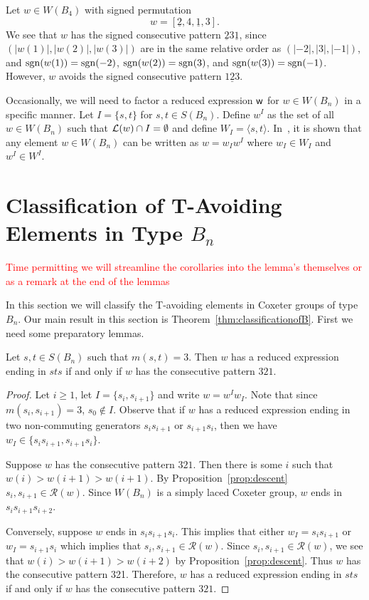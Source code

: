 \begin{example}
Let $w \in W(B_4)$ with signed permutation \[w=[\underline{2},4, \underline{1}, 3].\] We see that $w$ has the signed consecutive pattern $\underline{2} 3 \underline{1}$, since $(|w(1)|, |w(2)|, |w(3)|)$ are in the same relative order as $(|-2|, |3|, |-1|)$, and $\mathrm{sgn}(w(1))=\mathrm{sgn}(-2)$, $\mathrm{sgn}(w(2))=\mathrm{sgn}(3)$, and $\mathrm{sgn}(w(3))=\mathrm{sgn}(-1)$. However, $w$ avoids the signed consecutive pattern $1\underline{2}3$.
\end{example}

Occasionally, we will need to factor a reduced expression $\mathsf{w}$ for $w \in W(B_n)$ in a specific manner. Let $I=\{s,t\}$ for $s, t \in S(B_n)$. Define $w^I$ as the set of all $w \in W(B_n)$ such that $\mathcal{L}(w) \cap I= \emptyset$ and define $W_I=\langle s,t \rangle$. In~\cite{Humphreys1990}, it is shown that any element $w \in W(B_n)$ can be written as $w=w_Iw^I$ where $w_I \in W_I$ and $w^I \in W^I$.

\section{Classification of T-Avoiding Elements in Type $B_n$}\label{sec:TAB}

\textcolor{red}{Time permitting we will streamline the corollaries into the lemma's themselves or as a remark at the end of the lemmas}

In this section we will classify the T-avoiding elements in Coxeter groups of type $B_n$. Our main result in this section is Theorem~\ref{thm:classificationofB}. First we need some preparatory lemmas. 

\begin{lemma}\label{lem:sts}
Let $s,t \in S(B_n)$ such that $m(s,t)=3$. Then $w$ has a reduced expression ending in $sts$ if and only if $w$ has the consecutive pattern $321$.
\begin{proof}
	Let $i \geq 1$, let $I=\{s_i,s_{i+1}\}$ and write $w=w^Iw_I$. Note that since $m(s_i,s_{i+1})=3$, $s_0 \notin I$. Observe that if $w$ has a reduced expression ending in two non-commuting generators $s_is_{i+1}$ or $s_{i+1}s_i$, then we have $w_I \in \{s_is_{i+1}, s_{i+1}s_i\}$.
	
	Suppose $w$ has the consecutive pattern $321$. Then there is some $i$ such that $w(i) > w(i+1) > w(i+1)$. By Proposition~\ref{prop:descent} $s_i,s_{i+1} \in \mathcal{R}(w)$. Since $W(B_n)$ is a simply laced Coxeter group, $w$ ends in $s_is_{i+1}s_{i+2}$.
	
	Conversely, suppose $w$ ends in $s_is_{i+1}s_i$. This implies that either $w_I=s_is_{i+1}$ or $w_I=s_{i+1}s_i$ which implies that $s_i,s_{i+1} \in \mathcal{R}(w)$. Since $s_i,s_{i+1} \in \mathcal{R}(w)$, we see that $w(i)>w(i+1)>w(i+2)$ by Proposition~\ref{prop:descent}. Thus $w$ has the consecutive pattern 321.
	Therefore, $w$ has a reduced expression ending in $sts$ if and only if $w$ has the consecutive pattern $321$. 
\end{proof}	
\end{lemma}

